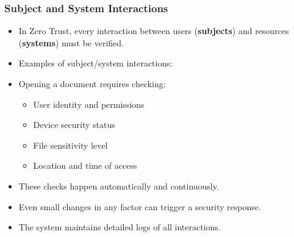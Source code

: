 \documentclass{beamer}
\begin{document}
\begin{frame}
    \frametitle{Subject and System Interactions}
    \begin{itemize}
        \item In Zero Trust, every interaction between users (\textbf{subjects}) and resources (\textbf{systems}) must be verified.
        \item Examples of subject/system interactions:
        \item Opening a document requires checking:
            \begin{itemize}
                \item User identity and permissions
                \item Device security status
                \item File sensitivity level
                \item Location and time of access
            \end{itemize}
        \item These checks happen automatically and continuously.
        \item Even small changes in any factor can trigger a security response.
        \item The system maintains detailed logs of all interactions.
    \end{itemize}
\end{frame}
\end{document}
